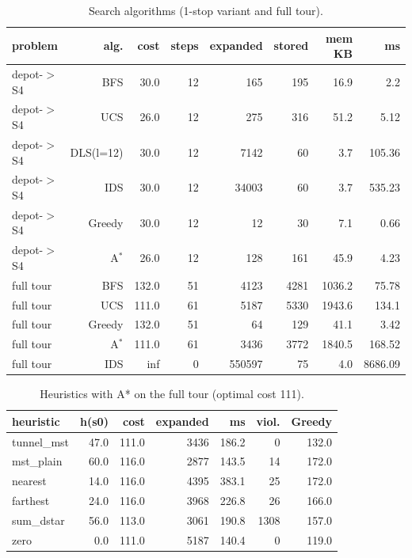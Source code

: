 
\begin{table}[t]
\centering
\footnotesize
\caption{Search algorithms (1-stop variant and full tour).}
\label{tab:alg}
\setlength{\tabcolsep}{3pt}
\begin{tabular}{lrrrrrrr}
\toprule
problem & alg. & cost & steps & expanded & stored & mem KB & ms \\
\midrule
depot-$>$S4 & BFS & 30.0 & 12 & 165 & 195 & 16.9 & 2.2 \\
depot-$>$S4 & UCS & 26.0 & 12 & 275 & 316 & 51.2 & 5.12 \\
depot-$>$S4 & DLS(l=12) & 30.0 & 12 & 7142 & 60 & 3.7 & 105.36 \\
depot-$>$S4 & IDS & 30.0 & 12 & 34003 & 60 & 3.7 & 535.23 \\
depot-$>$S4 & Greedy & 30.0 & 12 & 12 & 30 & 7.1 & 0.66 \\
depot-$>$S4 & A$^*$ & 26.0 & 12 & 128 & 161 & 45.9 & 4.23 \\
full tour & BFS & 132.0 & 51 & 4123 & 4281 & 1036.2 & 75.78 \\
full tour & UCS & 111.0 & 61 & 5187 & 5330 & 1943.6 & 134.1 \\
full tour & Greedy & 132.0 & 51 & 64 & 129 & 41.1 & 3.42 \\
full tour & A$^*$ & 111.0 & 61 & 3436 & 3772 & 1840.5 & 168.52 \\
full tour & IDS & inf & 0 & 550597 & 75 & 4.0 & 8686.09 \\
\bottomrule
\end{tabular}
\end{table}

\begin{table}[t]
\centering
\footnotesize
\caption{Heuristics with A* on the full tour (optimal cost 111).}
\label{tab:heur}
\setlength{\tabcolsep}{3pt}
\begin{tabular}{lrrrrrr}
\toprule
heuristic & h(s0) & cost & expanded & ms & viol. & Greedy \\
\midrule
tunnel\_mst & 47.0 & 111.0 & 3436 & 186.2 & 0 & 132.0 \\
mst\_plain & 60.0 & 116.0 & 2877 & 143.5 & 14 & 172.0 \\
nearest & 14.0 & 116.0 & 4395 & 383.1 & 25 & 172.0 \\
farthest & 24.0 & 116.0 & 3968 & 226.8 & 26 & 166.0 \\
sum\_dstar & 56.0 & 113.0 & 3061 & 190.8 & 1308 & 157.0 \\
zero & 0.0 & 111.0 & 5187 & 140.4 & 0 & 119.0 \\
\bottomrule
\end{tabular}
\end{table}

